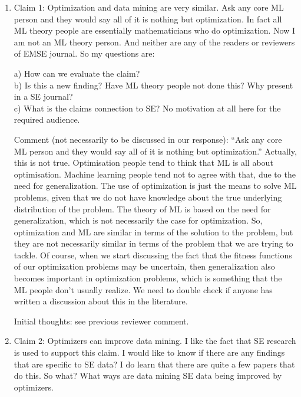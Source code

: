 \documentclass{article}
\newenvironment{com}{\color{blue}\begin{itshape}}{\end{itshape}\vspace{1ex}}
\begin{document}
\begin{enumerate}
\item \begin{com}

Claim 1: Optimization and data mining are very similar. Ask any core ML person and they would say all of it is nothing but optimization. In fact all ML theory people are essentially mathematicians who do optimization. Now I am not an ML theory person. And neither are any of the readers or reviewers of EMSE journal. So my questions are:

a) How can we evaluate the claim? \\
b) Is this a new finding? Have ML theory people not done this? Why present in a SE journal? \\
c) What is the claims connection to SE? No motivation at all here for the required audience. 
\end{com}

Comment (not necessarily to be discussed in our response): ``Ask any core ML person and they would say all of it is nothing but optimization.'' Actually, this is not true. Optimisation people tend to think that ML is all about optimisation. Machine learning people tend not to agree with that, due to the need for generalization. The use of optimization is just the means to solve ML problems, given that we do not have knowledge about the true underlying distribution of the problem. The theory of ML is based on the need for generalization, which is not necessarily the case for optimization. So, optimization and ML are similar in terms of the solution to the problem, but they are not necessarily similar in terms of the problem that we are trying to tackle. Of course, when we start discussing the fact that the fitness functions of our optimization problems may be uncertain, then generalization also becomes important in optimization problems, which is something that the ML people don't usually realize. We need to double check if anyone has written a discussion about this in the literature.

Initial thoughts: see previous reviewer comment.


\item \begin{com}

Claim 2: Optimizers can improve data mining. I like the fact that SE research is used to support this claim. I would like to know if there are any findings that are specific to SE data? I do learn that there are quite a few papers that do this. So what? What ways are data mining SE data being improved by optimizers. 
\end{com}


\end{enumerate}
\end{document}
